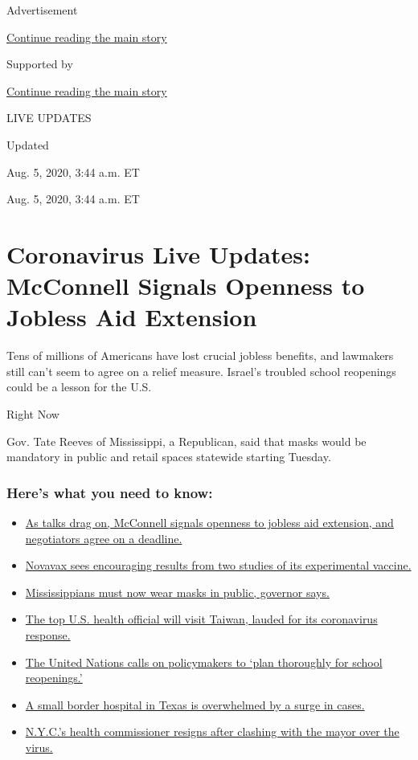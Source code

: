 Advertisement

\protect\hyperlink{after-top}{Continue reading the main story}

Supported by

\protect\hyperlink{after-sponsor}{Continue reading the main story}

LIVE UPDATES

Updated~

Aug. 5, 2020, 3:44 a.m. ET

Aug. 5, 2020, 3:44 a.m. ET

\hypertarget{coronavirus-live-updates-mcconnell-signals-openness-to-jobless-aid-extension}{%
\section{Coronavirus Live Updates: McConnell Signals Openness to Jobless
Aid
Extension}\label{coronavirus-live-updates-mcconnell-signals-openness-to-jobless-aid-extension}}

Tens of millions of Americans have lost crucial jobless benefits, and
lawmakers still can't seem to agree on a relief measure. Israel's
troubled school reopenings could be a lesson for the U.S.

Right Now

Gov. Tate Reeves of Mississippi, a Republican, said that masks would be
mandatory in public and retail spaces statewide starting Tuesday.

\hypertarget{heres-what-you-need-to-know}{%
\subsubsection{Here's what you need to
know:}\label{heres-what-you-need-to-know}}

\begin{itemize}
\tightlist
\item
  \protect\hyperlink{link-762df92}{As talks drag on, McConnell signals
  openness to jobless aid extension, and negotiators agree on a
  deadline.}
\item
  \protect\hyperlink{link-1228a480}{Novavax sees encouraging results
  from two studies of its experimental vaccine.}
\item
  \protect\hyperlink{link-794484ed}{Mississippians must now wear masks
  in public, governor says.}
\item
  \protect\hyperlink{link-30928a04}{The top U.S. health official will
  visit Taiwan, lauded for its coronavirus response.}
\item
  \protect\hyperlink{link-50f7386d}{The United Nations calls on
  policymakers to `plan thoroughly for school reopenings.'}
\item
  \protect\hyperlink{link-567c6115}{A small border hospital in Texas is
  overwhelmed by a surge in cases.}
\item
  \protect\hyperlink{link-4d1eafa8}{N.Y.C.'s health commissioner resigns
  after clashing with the mayor over the virus.}
\end{itemize}

